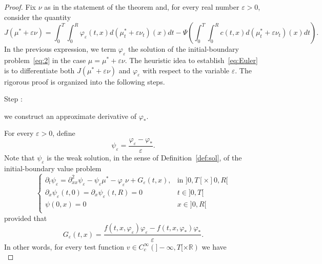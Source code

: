 \documentclass[11pt,leqno]{amsart}
\newcounter{stepnb}
\numberwithin{equation}{section}
\begin{document}
\begin{proof}
  Fix $\nu$ as in the statement of the theorem and, for every
  real number ${\varepsilon}>0$,
  consider the quantity
  \begin{equation*}
    J(\mu^*+{\varepsilon} \nu)=
    \int_0^T\int_0^R {\varphi}_{\varepsilon} (t, x) d(\mu_t^*+{\varepsilon}\nu_t)(x)dt
    -\Psi\left(\int_0^T\int_0^R c(t,x)d(\mu_t^*+{\varepsilon}\nu_t)(x)dt\right).
  \end{equation*}
  In the previous expression, we term ${\varphi}_{\varepsilon}$ the solution of the initial-boundary problem~\eqref{eq:2} in the case  $\mu = \mu^*+{\varepsilon}\nu$. The heuristic idea to establish~\eqref{eq:Euler} is to differentiate both $J(\mu^*+{\varepsilon} \nu)$ and ${\varphi}_{\varepsilon}$ with respect to the variable ${\varepsilon}$. The rigorous proof is organized into the following steps. \\
{\setcounter{stepnb}{0}}
{{{\sc \addtocounter{stepnb}{1}\noindent  Step :} {we construct an approximate derivative of ${\varphi}_*$}.}}
For every ${\varepsilon} > 0$, define
\begin{equation}
\label{e:cosaepsieps}
\psi_{\varepsilon}=\frac{{\varphi}_{\varepsilon}-{\varphi}_\ast}{\varepsilon}.
\end{equation}
Note that $\psi_{\varepsilon}$ is the weak solution, in the sense of Definition~\ref{def:sol}, of the initial-boundary value problem
\begin{equation}
\label{eq:psieps}
\begin{cases}
{\partial_t}\psi_{\varepsilon}={\partial_{xx}^2}\psi_{\varepsilon}-\psi_{\varepsilon}\mu^\ast-{\varphi}_{\varepsilon}\nu+G_{\varepsilon}(t, x),& \text{in $]0, T[ \times ]0, R[$}\\
{\partial_x } \psi_{\varepsilon} (t,0)={\partial_x } \psi_{\varepsilon} (t,R)=0 & t \in ]0, T[  \\
\psi(0,x)=0 & x\in ]0,R[ \\\end{cases}
\end{equation}
provided that 
\begin{equation}
\label{e:cosaeGgrande}
G_{\varepsilon}(t,x)= \frac{f (t, x, {\varphi}_{\varepsilon} ) {\varphi}_{\varepsilon} -
f (t, x, {\varphi}_\ast ) {\varphi}_\ast  }{\varepsilon}.
\end{equation}
In other words, for every test function $v \in C^\infty_c (]-\infty, T[ \times {\mathbb{R}})$ we have 
\begin{equation}
\label{e:distrform6}

\end{equation}
\end{proof}
\end{document}
